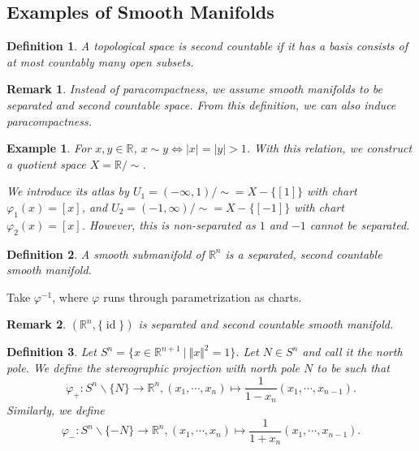 \documentclass[10pt]{article}
\newtheorem{definition}{Definition}[section]
\newtheorem{remark}{Remark}[section]
\newtheorem{example}{Example}[section]
\DeclareMathOperator{\id}{id}
\newcommand{\norm}[1]{\Vert #1 \Vert}
\newcommand{\R}[0]{\mathbb{R}}
\newcommand{\sep}[0]{\:|\:}
\begin{document}
\subsection{Examples of Smooth Manifolds}

\begin{definition}
  A topological space is second countable if it has a basis consists of at most countably many open subsets.
\end{definition}

\begin{remark}
  Instead of paracompactness, we assume smooth manifolds to be separated and second countable space. From this definition, we can also induce paracompactness.
\end{remark}

\begin{example}
For $x,y\in\R$, $x\sim y \Leftrightarrow \vert x\vert = \vert y \vert > 1$. With this relation, we construct a quotient space $X = \R/\sim$. 
\par We introduce its atlas by $U_1 = (-\infty,1)/\sim=X-\{[1]\}$ with chart $\varphi_1(x) = [x]$, and $U_2 = (-1,\infty)/\sim=X-\{[-1]\}$ with chart $\varphi_2(x) = [x]$. However, this is non-separated as $1$ and $-1$ cannot be separated.
\end{example}

\begin{definition}
  A smooth submanifold of $\R^n$ is a separated, second countable smooth manifold. 
\end{definition}

Take $\varphi^{-1}$, where $\varphi$ runs through parametrization as charts.

\begin{remark}
$(\R^n,\{\id\})$ is separated and second countable smooth manifold.
\end{remark}

\begin{definition}
  Let $S^n = \{x\in\R^{n+1}\sep\norm{x}^2 = 1\}$. Let $N\in S^n$ and call it the north pole. We define the stereographic projection with north pole $N$ to be such that
  \begin{equation*}
    \varphi_+:S^n\backslash\{N\}\to\R^n,(x_1,\cdots,x_{n})\mapsto {\frac 1 {1-x_n}}(x_1,\cdots,x_{n-1}).
  \end{equation*}
  Similarly, we define 
  \begin{equation*}
    \varphi_-:S^n\backslash\{-N\}\to\R^n,(x_1,\cdots,x_{n})\mapsto {\frac 1 {1+x_n}}(x_1,\cdots,x_{n-1}).
  \end{equation*}
\end{definition}
\end{document}
